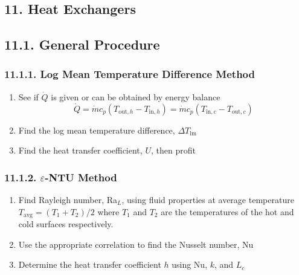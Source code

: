 \begin{multicols*}{2}
\section*{11. Heat Exchangers}
\subsection*{11.1. General Procedure}
\subsubsection*{11.1.1. Log Mean Temperature Difference Method}
\begin{enumerate}
    \item See if $\dot{Q}$ is given or can be obtained by energy balance
    \[ \dot{Q} = \dot{m} c_p (T_{\text{out},h} - T_{\text{in},h}) = \dot{m} c_p (T_{\text{in},c} - T_{\text{out},c}) \]
    \item Find the log mean temperature difference, $\Delta T_{\text{lm}}$
    \item Find the heat transfer coefficient, $U$, then profit
\end{enumerate}
\subsubsection*{11.1.2. $\varepsilon$-NTU Method}
\begin{enumerate}
    \item Find Rayleigh number, Ra$_L$, using fluid properties at average temperature $T_{\text{avg}} = (T_1 + T_2)/2$
    where $T_1$ and $T_2$ are the temperatures of the hot and cold surfaces respectively.
    \item Use the appropriate correlation to find the Nusselt number, Nu
    \item Determine the heat transfer coefficient $h$ using Nu, $k$, and $L_c$
\end{enumerate}

\end{multicols*}
